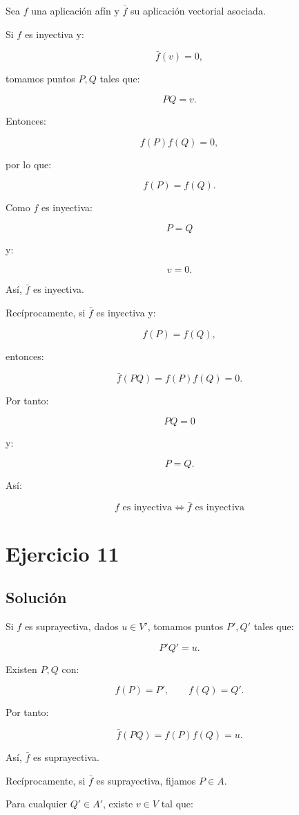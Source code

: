 \documentclass[11pt,a4paper]{article}
\begin{document}
Sea \(f\) una aplicación afín y \(\bar f\) su aplicación vectorial asociada.

Si \(f\) es inyectiva y:

\[
\bar f(v)=0,
\]

tomamos puntos \(P,Q\) tales que:

\[
PQ=v.
\]

Entonces:

\[
f(P)f(Q)=0,
\]

por lo que:

\[
f(P)=f(Q).
\]

Como \(f\) es inyectiva:

\[
P=Q
\]

y:

\[
v=0.
\]

Así, \(\bar f\) es inyectiva.

Recíprocamente, si \(\bar f\) es inyectiva y:

\[
f(P)=f(Q),
\]

entonces:

\[
\bar f(PQ)=f(P)f(Q)=0.
\]

Por tanto:

\[
PQ=0
\]

y:

\[
P=Q.
\]

Así:

\[
\boxed{
f\text{ es inyectiva}\iff\bar f\text{ es inyectiva}
}
\]

\section{Ejercicio 11}
\subsection{Solución}

Si \(f\) es suprayectiva, dados \(u\in V'\), tomamos puntos \(P',Q'\) tales que:

\[
P'Q'=u.
\]

Existen \(P,Q\) con:

\[
f(P)=P',
\qquad
f(Q)=Q'.
\]

Por tanto:

\[
\bar f(PQ)
=
f(P)f(Q)
=
u.
\]

Así, \(\bar f\) es suprayectiva.

Recíprocamente, si \(\bar f\) es suprayectiva, fijamos \(P\in A\).

Para cualquier \(Q'\in A'\), existe \(v\in V\) tal que:
\end{document}
